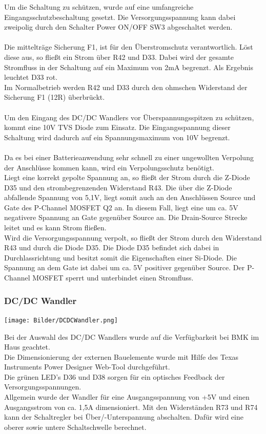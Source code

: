 \documentclass[a4paper,11pt]{scrartcl}
\begin{document}
Um die Schaltung zu schützen, wurde auf eine umfangreiche Eingangsschutzbeschaltung gesetzt. Die Versorgungsspannung kann dabei zweipolig durch den Schalter \glqq Power ON/OFF SW3 \grqq{} abgeschaltet werden.
\\
\\
Die mittelträge Sicherung F1, ist für den Überstromschutz verantwortlich. Löst diese aus, so fließt ein Strom über R42 und D33. Dabei wird der gesamte Stromfluss in der Schaltung auf ein Maximum von 2mA begrenzt. Als Ergebnis leuchtet D33 rot.
\\
Im Normalbetrieb werden R42 und D33 durch den ohmschen Widerstand der Sicherung F1 (12R) überbrückt.
\\
\\
Um den Eingang des DC/DC Wandlers vor Überspannungsspitzen zu schützen, kommt eine 10V TVS Diode zum Einsatz. Die Eingangsspannung dieser Schaltung wird dadurch auf ein Spannungsmaximum von 10V begrenzt. 
\\
\\
Da es bei einer Batterieanwendung sehr schnell zu einer ungewollten Verpolung der Anschlüsse kommen kann, wird ein Verpolungsschutz benötigt.
\\
Liegt eine korrekt gepolte Spannung an, so fließt der Strom durch die Z-Diode D35 und den strombegrenzenden Widerstand R43. Die über die Z-Diode abfallende Spannung von 5,1V, liegt somit auch an den Anschlüssen \glqq Source und Gate \grqq{} des P-Channel MOSFET Q2 an.
In diesem Fall, liegt eine um ca. 5V negativere Spannung an Gate gegenüber Source an. Die Drain-Source Strecke leitet und es kann Strom fließen.
\\ 
Wird die Versorgungsspannung verpolt, so fließt der Strom durch den Widerstand R43 und durch die Diode D35. Die Diode D35 befindet sich dabei in Durchlassrichtung und besitzt somit die Eigenschaften einer Si-Diode.
Die Spannung an dem Gate ist dabei um ca. 5V positiver gegenüber Source. Der P-Channel MOSFET sperrt und unterbindet einen Stromfluss.
\\

\subsubsection{DC/DC Wandler}

\begin{center}
\texttt{[image: Bilder/DCDCWandler.png]}
\end{center}

Bei der Auswahl des DC/DC Wandlers wurde auf die Verfügbarkeit bei BMK im Haus geachtet.
\\
Die Dimensionierung der externen Bauelemente wurde mit Hilfe des \glqq Texas Instruments Power Designer\grqq{} Web-Tool durchgeführt.
\\
Die grünen LED's D36 und D38 sorgen für ein optisches Feedback der Versorgungsspannungen.
\\
Allgemein wurde der Wandler für eine Ausgangsspannung von +5V und einen Ausgangsstrom von ca. 1,5A dimensioniert. Mit den Widerständen R73 und R74 kann der Schaltregler bei Über/-Unterspannung abschalten. Dafür wird eine oberer sowie untere Schaltschwelle berechnet.
\end{document}
